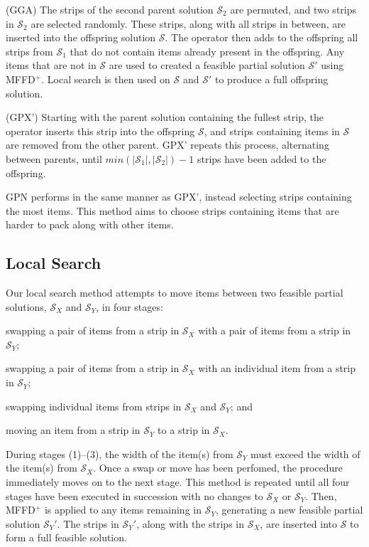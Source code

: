 \documentclass{elsarticle}
\begin{document}
(GGA) The strips of the second parent solution $\mathcal{S}_2$ are permuted, and two strips in $\mathcal{S}_2$ are selected randomly. These strips, along with all strips in between, are inserted into the offspring solution $\mathcal{S}$. The operator then adds to the offspring all strips from $\mathcal{S}_1$ that do not contain items already present in the offspring. Any items that are not in $\mathcal{S}$ are used to created a feasible partial solution $\mathcal{S}'$ using MFFD$^+$. Local search is then used on $\mathcal{S}$ and $\mathcal{S}'$ to produce a full offspring solution.

(GPX') Starting with the parent solution containing the fullest strip, the operator inserts this strip into the offspring $\mathcal{S}$, and strips containing items in $\mathcal{S}$ are removed from the other parent. GPX' repeats this process, alternating between parents, until $min (|\mathcal{S}_1|,|\mathcal{S}_2|) - 1$ strips have been added to the offspring.

GPN performs in the same manner as GPX', instead selecting strips containing the most items. This method aims to choose strips containing items that are harder to pack along with other items.

\subsection{Local Search}
Our local search method attempts to move items between two feasible partial solutions, $\mathcal{S}_X$ and $\mathcal{S}_Y$, in four stages: \begin{enumerate*}[label={(\arabic*)}]
	\item swapping a pair of items from a strip in $\mathcal{S}_X$ with a pair of items from a strip in $\mathcal{S}_Y$;
	\item swapping a pair of items from a strip in $\mathcal{S}_X$ with an individual item from a strip in $\mathcal{S}_Y$;
	\item swapping individual items from strips in $\mathcal{S}_X$ and $\mathcal{S}_Y$; and
	\item moving an item from a strip in $\mathcal{S}_Y$ to a strip in $\mathcal{S}_X$.
\end{enumerate*} 
During stages (1)--(3), the width of the item(s) from $\mathcal{S}_Y$ must exceed the width of the item(s) from $\mathcal{S}_X$. Once a swap or move has been perfomed, the procedure immediately moves on to the next stage. This method is repeated until all four stages have been executed in succession with no changes to $\mathcal{S}_X$ or $\mathcal{S}_Y$. Then, MFFD$^+$ is applied to any items remaining in $\mathcal{S}_Y$, generating a new feasible partial solution $\mathcal{S}_Y'$. The strips in $\mathcal{S}_Y'$, along with the strips in $\mathcal{S}_X$, are inserted into $\mathcal{S}$ to form a full feasible solution.
\end{document}

